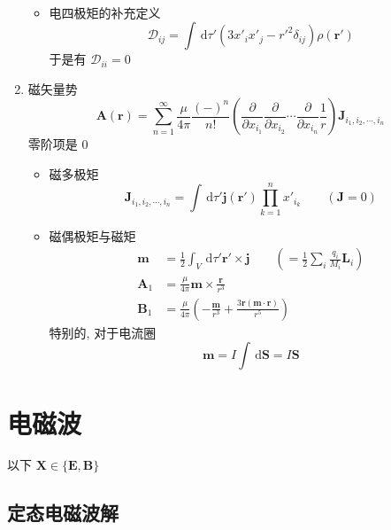\documentclass[12pt,a4paper]{article}%
\numberwithin{equation}{section}%
\renewcommand*{\vec}[1]{\bm{#1}}%
\newcommand{\dif}{\,\mathrm d}
\begin{document}
\begin{enumerate}
\begin{itemize}
\begin{align}
        \end{align}
        \item 电四极矩的补充定义
        \begin{equation}\label{equ:elctro_quadrupole}
            \mathscr D_{ij} = \int\dif \tau'(3x'_ix'_j - r'^2\delta_{ij})\rho(\vec r')
        \end{equation}
        于是有 $\mathscr D_{ii} = 0$
    \end{itemize}
    \item 磁矢量势
    \begin{equation}\label{equ:multipole_for_A}
        \vec A(\vec r) = \sum_{n=1}^\infty \frac{\mu}{4\pi}\frac{(-)^n}{n!}\left(\frac{\partial}{\partial x_{i_1}}\frac{\partial}{\partial x_{i_2}}\cdots\frac{\partial}{\partial x_{i_n}}\frac 1 r\right)\vec J_{i_1,i_2,\cdots,i_n}
    \end{equation}
    零阶项是 $0$
    \begin{itemize}
        \item 磁多极矩 
        \begin{equation}\label{equ:mag_multipole}
            \vec J_{i_1,i_2,\cdots,i_n} = \int\dif \tau'\vec j(\vec r')\prod_{k=1}^n x'_{i_k}\qquad (\vec J = 0)
        \end{equation}
        \item 磁偶极矩与磁矩
        \begin{align}
            \vec m &= \frac 12\int_V\dif \tau'\vec r'\times\vec j \qquad\left(=\frac 12\sum_i\frac{q_i}{M_i}\vec L_i\right) \label{equ:mag_dipole}\\
            \vec A_1 &= \frac{\mu}{4\pi}\vec m\times\frac{\vec r}{r^3} \\
            \vec B_1 &= \frac{\mu}{4\pi}\left(-\frac{\vec m}{r^3} + \frac{3\vec r(\vec m\cdot\vec r)}{r^5}\right)
        \end{align}
        特别的, 对于电流圈
        \begin{equation}
            \vec m = I\int\dif\vec S = I\vec S
        \end{equation}
    \end{itemize}
\end{enumerate}

\section{电磁波} %
\label{sec:EMW}
以下 $\vec X \in \{\vec E, \vec B\}$
\subsection{定态电磁波解} %
\label{sub:stationary_state}
\end{document}
